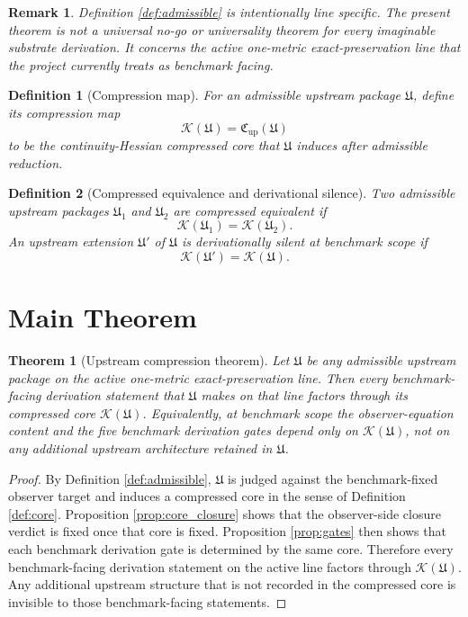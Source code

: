 \documentclass[11pt]{article}
\newcommand{\CompressionData}{\mathfrak C_{\mathrm{up}}}
\newcommand{\CompressionMap}{\mathcal K}
\newcommand{\UpstreamPackage}{\mathfrak U}
\newtheorem{definition}{Definition}
\newtheorem{remark}{Remark}
\newtheorem{theorem}{Theorem}
\begin{document}
\begin{remark}
Definition \ref{def:admissible} is intentionally line specific. The present theorem is not a universal no-go or universality theorem for every imaginable substrate derivation. It concerns the active one-metric exact-preservation line that the project currently treats as benchmark facing.
\end{remark}

\begin{definition}[Compression map]
For an admissible upstream package \(\UpstreamPackage\), define its \emph{compression map}
\[
\CompressionMap(\UpstreamPackage)=\CompressionData(\UpstreamPackage)
\]
to be the continuity-Hessian compressed core that \(\UpstreamPackage\) induces after admissible reduction.
\end{definition}

\begin{definition}[Compressed equivalence and derivational silence]
Two admissible upstream packages \(\UpstreamPackage_1\) and \(\UpstreamPackage_2\) are \emph{compressed equivalent} if
\[
\CompressionMap(\UpstreamPackage_1)=\CompressionMap(\UpstreamPackage_2).
\]
An upstream extension \(\UpstreamPackage'\) of \(\UpstreamPackage\) is \emph{derivationally silent at benchmark scope} if
\[
\CompressionMap(\UpstreamPackage')=\CompressionMap(\UpstreamPackage).
\]
\end{definition}

\section{Main Theorem}

\begin{theorem}[Upstream compression theorem]
\label{thm:compression}
Let \(\UpstreamPackage\) be any admissible upstream package on the active one-metric exact-preservation line. Then every benchmark-facing derivation statement that \(\UpstreamPackage\) makes on that line factors through its compressed core \(\CompressionMap(\UpstreamPackage)\). Equivalently, at benchmark scope the observer-equation content and the five benchmark derivation gates depend only on \(\CompressionMap(\UpstreamPackage)\), not on any additional upstream architecture retained in \(\UpstreamPackage\).
\end{theorem}

\begin{proof}
By Definition \ref{def:admissible}, \(\UpstreamPackage\) is judged against the benchmark-fixed observer target and induces a compressed core in the sense of Definition \ref{def:core}. Proposition \ref{prop:core_closure} shows that the observer-side closure verdict is fixed once that core is fixed. Proposition \ref{prop:gates} then shows that each benchmark derivation gate is determined by the same core. Therefore every benchmark-facing derivation statement on the active line factors through \(\CompressionMap(\UpstreamPackage)\). Any additional upstream structure that is not recorded in the compressed core is invisible to those benchmark-facing statements.
\end{proof}
\end{document}
